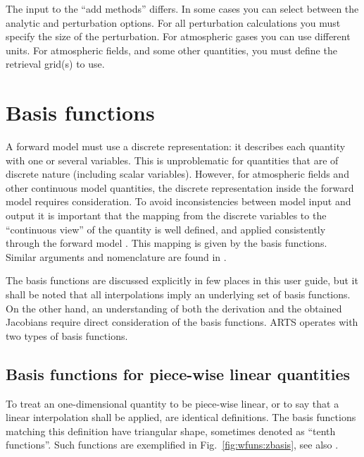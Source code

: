 The input to the ``add methods'' differs. In some cases you can select between
the analytic and perturbation options. For all perturbation calculations you
must specify the size of the perturbation. For atmospheric gases you can use
different units. For atmospheric fields, and some other quantities, you must
define the retrieval grid(s) to use.



 
\section{Basis functions}
\label{sec:wfuns:basis}

A forward model must use a discrete representation: it describes each quantity
with one or several variables. This is unproblematic for quantities that are of
discrete nature (including scalar variables). However, for atmospheric fields
and other continuous model quantities, the discrete representation inside the
forward model requires consideration. To avoid inconsistencies between model
input and output it is important that the mapping from the discrete variables
to the ``continuous view'' of the quantity is well defined, and applied
consistently through the forward model . This mapping is given by the basis
functions. Similar arguments and nomenclature are found
in \citet{read:thecl:06}.

The basis functions are discussed explicitly in few places in this user guide,
but it shall be noted that all interpolations imply an underlying set of basis
functions. On the other hand, an understanding of both the derivation and the
obtained Jacobians require direct consideration of the basis functions. ARTS
operates with two types of basis functions.




\subsection{Basis functions for piece-wise linear quantities}
\label{sec:wfuns:basis1}
%
To treat an one-dimensional quantity to be piece-wise linear, or to say that a
linear interpolation shall be applied, are identical definitions. The basis
functions matching this definition have triangular shape, sometimes denoted as
``tenth functions''. Such functions are exemplified in
Fig.~\ref{fig:wfuns:zbasis}, see also \citet{buehler:artst:05}.

